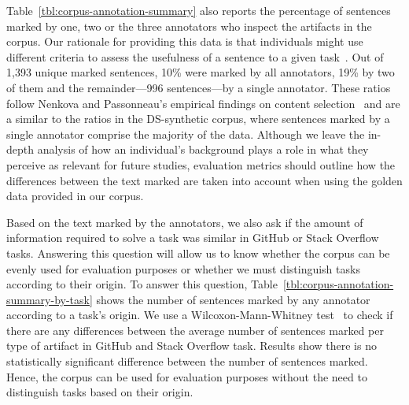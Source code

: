 



Table~\ref{tbl:corpus-annotation-summary} also reports the percentage of sentences marked by one, two or the three annotators who inspect the artifacts in the corpus.
Our rationale for providing this data is that individuals might use different criteria to
assess the usefulness of a sentence to a given task~\cite{Barry1994, Barry1998}.
Out of 1,393
unique marked
sentences, 
10\% were marked by all annotators,
19\% by two of them and the remainder---996 sentences---by a single annotator.
These ratios follow Nenkova and Passonneau's empirical findings on 
content selection~\cite{Nenkova2004}
and are a similar to the ratios in the \acs{DS-synthetic} corpus,
where sentences marked by a single annotator comprise the majority of the data.
Although we leave the in-depth analysis of how an individual's background plays a role in what they perceive as relevant for future studies,  evaluation metrics should outline how 
the differences between the text marked are taken into account when 
using the golden data provided in our corpus. %



Based on the text marked by the annotators,   
we also ask if the amount of information required to solve a task was similar in GitHub or Stack Overflow tasks.
Answering this question will allow us to know whether 
the corpus can be evenly used for evaluation purposes or 
whether we must distinguish tasks according to their origin.
To answer this question, Table~\ref{tbl:corpus-annotation-summary-by-task} shows the number of sentences marked by any annotator according to a task's origin.
We use a Wilcoxon-Mann-Whitney test~\cite{mannWhitneyU} to check if there are any differences between the
average number of sentences marked per type of artifact in GitHub and Stack Overflow task.
Results show there is no statistically significant difference 
between the number of sentences  marked.
Hence, the corpus can be used for evaluation purposes without the need to distinguish tasks based on their origin.













